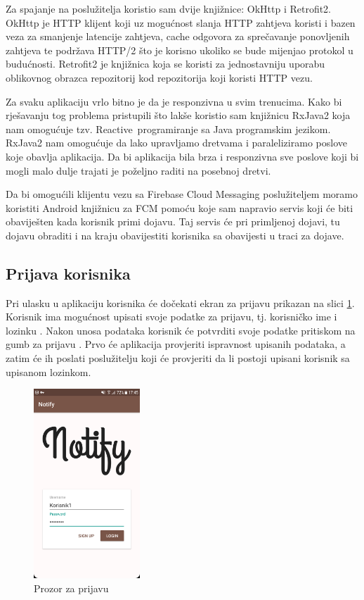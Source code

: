 \documentclass[times, utf8, zavrsni]{fer}
\begin{document}
{Za spajanje na poslužitelja koristio sam dvije knjižnice: OkHttp i Retrofit2. OkHttp je HTTP klijent koji uz mogućnost slanja HTTP zahtjeva koristi i bazen veza za smanjenje latencije zahtjeva, cache odgovora za sprečavanje ponovljenih zahtjeva te podržava HTTP/2 što je korisno ukoliko se bude mijenjao protokol u budućnosti. Retrofit2 je knjižnica koja se koristi za jednostavniju uporabu oblikovnog obrazca repozitorij kod repozitorija koji koristi HTTP vezu.

Za svaku aplikaciju vrlo bitno je da je responzivna u svim trenucima. Kako bi rješavanju tog problema pristupili što lakše koristio sam knjižnicu RxJava2 koja nam omogućuje tzv. \glqq Reactive\grqq\  programiranje sa Java programskim jezikom. RxJava2 nam omogućuje da lako upravljamo dretvama i paraleliziramo poslove koje obavlja aplikacija. Da bi aplikacija bila brza i responzivna sve poslove koji bi mogli malo dulje trajati je poželjno raditi na posebnoj dretvi.

Da bi omogućili klijentu vezu sa Firebase Cloud Messaging poslužiteljem moramo koristiti Android knjižnicu za FCM pomoću koje sam napravio servis koji će biti obaviješten kada korisnik primi dojavu. Taj servis će pri primljenoj dojavi, tu dojavu obraditi i na kraju obavijestiti korisnika sa obavijesti u traci za dojave.

\subsection{Prijava korisnika}
Pri ulasku u aplikaciju korisnika će dočekati ekran za prijavu prikazan na slici \ref{fig:login-image}. Korisnik ima mogućnost upisati svoje podatke za prijavu, tj. korisničko ime  i lozinku . Nakon unosa podataka korisnik će potvrditi svoje podatke pritiskom na gumb za prijavu . Prvo će aplikacija provjeriti ispravnost upisanih podataka, a zatim će ih poslati poslužitelju koji će provjeriti da li postoji upisani korisnik sa upisanom lozinkom.

\begin{figure}[htb]
\centering
\includegraphics[width=4cm]{img/ss-login.png}
\caption{Prozor za prijavu}
\label{fig:login-image}
\end{figure}

}
\end{document}
